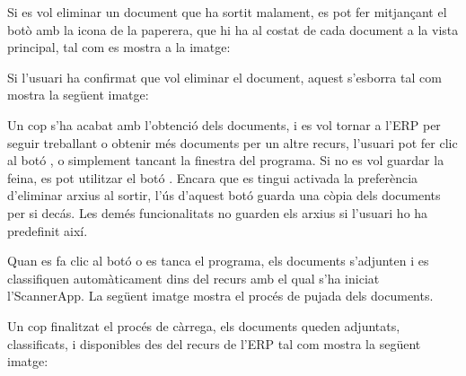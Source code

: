 \documentclass[letterpaper,11pt,catalan]{sphinxmanual}
\begin{document}
Si es vol eliminar un document que ha sortit malament, es pot fer mitjançant el botò
amb la icona de la paperera, que hi ha al costat de cada document a la vista principal,
tal com es mostra a la imatge:


Si l'usuari ha confirmat que vol eliminar el document, aquest s'esborra tal com mostra
la següent imatge:


\begin{DUlineblock}{0em}
\item[] 
\item[] 
\item[] 
\item[] 
\item[] 
\end{DUlineblock}

Un cop s'ha acabat amb l'obtenció dels documents, i es vol tornar a l'ERP per seguir
treballant o obtenir més documents per un altre recurs, l'usuari pot fer clic al botó , o simplement tancant la finestra del programa.
Si no es vol guardar la feina, es pot utilitzar el botó . Encara que es tingui activada la preferència d'eliminar arxius al sortir, l'ús d'aquest botó guarda una còpia dels documents per si decás. Les demés funcionalitats no guarden els arxius si l'usuari ho ha predefinit així.

Quan es fa clic al botó  o es tanca el programa, els documents s'adjunten i es classifiquen automàticament dins del recurs amb el qual s'ha iniciat l'ScannerApp. La següent imatge mostra el procés de pujada dels documents.


Un cop finalitzat el procés de càrrega, els documents queden adjuntats, classificats,
i disponibles des del recurs de l'ERP tal com mostra la següent imatge:
\end{document}
